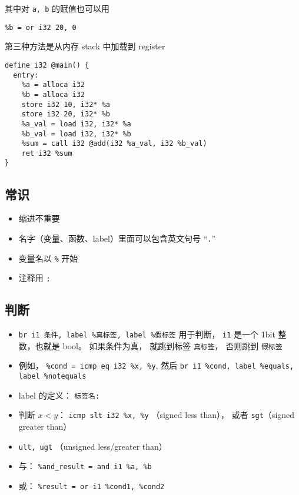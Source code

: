 其中对 \verb`a, b` 的赋值也可以用
\begin{lstlisting}[language=none]
%a = or i32 10, 0
%b = or i32 20, 0
\end{lstlisting}

第三种方法是从内存 stack 中加载到 register
\begin{lstlisting}[language=none]
define i32 @main() {
  entry:
    %a = alloca i32
    %b = alloca i32
    store i32 10, i32* %a
    store i32 20, i32* %b
    %a_val = load i32, i32* %a
    %b_val = load i32, i32* %b
    %sum = call i32 @add(i32 %a_val, i32 %b_val)
    ret i32 %sum
}
\end{lstlisting}

\subsection{常识}
\begin{itemize}
\item 缩进不重要
\item 名字（变量、函数、label）里面可以包含英文句号 “\verb`.`”
\item 变量名以 \verb`%` 开始
\item 注释用 \verb`;`
\end{itemize}

\subsection{判断}
\begin{itemize}
\item \verb`br i1 条件, label %真标签, label %假标签` 用于判断， \verb`i1` 是一个 1bit 整数，也就是 bool。 如果条件为真， 就跳到标签 \verb`真标签`， 否则跳到 \verb`假标签`
\item 例如， \verb`%cond = icmp eq i32 %x, %y`, 然后 \verb`br i1 %cond, label %equals, label %notequals`
\item label 的定义： \verb`标签名:`
\item 判断 $x < y$： \verb`icmp slt i32 %x, %y` （signed less than）， 或者 \verb`sgt`（signed greater than）
\item \verb`ult, ugt` （unsigned less/greater than）
\item 与： \verb`%and_result = and i1 %a, %b`
\item 或： \verb`%result = or i1 %cond1, %cond2`
\end{itemize}


